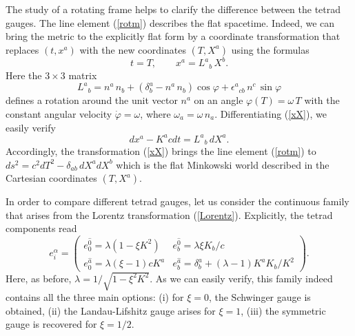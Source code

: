 \documentclass[preprint,showpacs,preprintnumbers,amsmath,amssymb]{revtex4}
\begin{document}
The study of a rotating frame helps to clarify the difference between the
tetrad gauges. The line element (\ref{rotm}) describes the flat spacetime. Indeed,
we can bring the metric to the explicitly flat form by a coordinate transformation
that replaces $(t, x^a)$ with the new coordinates $(T, X^a)$ using the formulas
\begin{equation}
t = T,\qquad x^a = L^a{}_b\,X^b.\label{xX}
\end{equation}
Here the $3\times 3$ matrix
\begin{equation}
L^a{}_b = n^a\,n_b + \left(\delta^a_b - n^a\,n_b\right)\cos\varphi
+ \epsilon^a{}_{cb}\,n^c\,\sin\varphi\label{rotL}
\end{equation}
defines a rotation around the unit vector $n^a$ on an angle $\varphi(T) = \omega\,T$
with the constant angular velocity $\dot{\varphi} = \omega$, where $\omega_a =
\omega\,n_a$. Differentiating (\ref{xX}), we easily verify
\begin{equation}
dx^a - K^acdt = L^a{}_b\,dX^a.\label{dxdX}
\end{equation}
Accordingly, the transformation (\ref{xX}) brings the line element (\ref{rotm})
to $ds^2 = c^2dT^2 - \delta_{ab}\,dX^adX^b$ which is the flat Minkowski world
described in the Cartesian coordinates $(T, X^a)$.

In order to compare different tetrad gauges, let us consider the continuous
family that arises from the Lorentz transformation (\ref{Lorentz}).
Explicitly, the tetrad components read
\begin{equation}
e^\alpha_i = \left(\begin{array}{c|c} e^{\widehat 0}_0 = \lambda(1 - \xi K^2) &
e^{\widehat 0}_b = \lambda\xi K_b/c\\ \hline e^{\widehat a}_0 =
\lambda (\xi - 1) c K^a & e^{\widehat a}_b= \delta^a_b + (\lambda - 1)K^aK_b/K^2
\end{array}\right).\label{hR}
\end{equation}
Here, as before, $\lambda = 1/\sqrt{1 - \xi^2K^2}$. As we can easily verify, this
family indeed contains all the three main options: (i) for $\xi = 0$, the Schwinger
gauge is obtained, (ii) the Landau-Lifshitz gauge arises for $\xi = 1$, (iii) the
symmetric gauge is recovered for $\xi = 1/2$.
\end{document}
